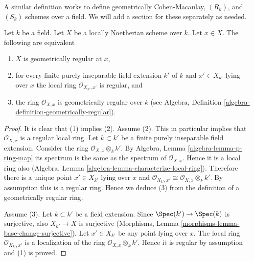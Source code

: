 \noindent
A similar definition works to define geometrically
Cohen-Macaulay, $(R_k)$, and $(S_k)$ schemes over a field.
We will add a section for these separately as needed.

\begin{lemma}
\label{lemma-geometrically-regular-at-point}
Let $k$ be a field.
Let $X$ be a locally Noetherian scheme over $k$.
Let $x \in X$.
The following are equivalent
\begin{enumerate}
\item $X$ is geometrically regular at $x$,
\item for every finite purely inseparable field extension $k'$ of $k$
and $x' \in X_{k'}$ lying over $x$ the local ring
$\mathcal{O}_{X_{k'}, x'}$ is regular, and
\item the ring $\mathcal{O}_{X, x}$ is geometrically
regular over $k$ (see
Algebra, Definition \ref{algebra-definition-geometrically-regular}).
\end{enumerate}
\end{lemma}

\begin{proof}
It is clear that (1) implies (2).
Assume (2). This in particular implies that $\mathcal{O}_{X, x}$
is a regular local ring. Let $k \subset k'$ be a finite purely inseparable
field extension. Consider the ring $\mathcal{O}_{X, x} \otimes_k k'$.
By Algebra, Lemma \ref{algebra-lemma-p-ring-map}
its spectrum is the same as the spectrum of $\mathcal{O}_{X, x}$.
Hence it is a local ring also
(Algebra, Lemma \ref{algebra-lemma-characterize-local-ring}).
Therefore there is a unique point $x' \in X_{k'}$ lying over $x$
and $\mathcal{O}_{X_{k'}, x'} \cong \mathcal{O}_{X, x} \otimes_k k'$.
By assumption this is a regular ring. Hence we deduce (3)
from the definition of a geometrically regular ring.

\medskip\noindent
Assume (3). Let $k \subset k'$ be a field extension. Since
$\Spec(k') \to \Spec(k)$ is surjective, also
$X_{k'} \to X$ is surjective
(Morphisms, Lemma \ref{morphisms-lemma-base-change-surjective}).
Let $x' \in X_{k'}$ be any point lying over $x$.
The local ring $\mathcal{O}_{X_{k'}, x'}$
is a localization of the ring $\mathcal{O}_{X, x} \otimes_k k'$.
Hence it is regular by assumption and (1) is proved.
\end{proof}

